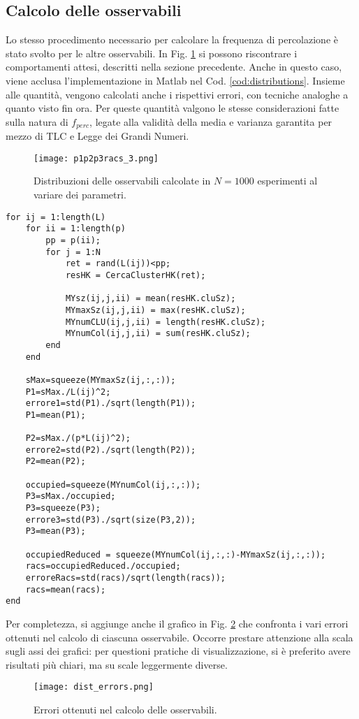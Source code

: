 \subsection*{Calcolo delle osservabili}
Lo stesso procedimento necessario per calcolare la frequenza di percolazione è stato svolto per 
le altre osservabili. In Fig. \ref{fig:distributions} si possono riscontrare i comportamenti 
attesi, descritti nella sezione precedente.
Anche in questo caso, viene acclusa l'implementazione in Matlab nel Cod. \ref{cod:distributions}.
Insieme alle quantità, vengono calcolati anche i rispettivi errori, con tecniche analoghe a quanto visto 
fin ora. Per queste quantità valgono le stesse considerazioni fatte sulla natura di $f_{perc}$,
legate alla validità della media e varianza garantita per mezzo di 
TLC e Legge dei Grandi Numeri.
\begin{figure}[ht]
    \texttt{[image: p1p2p3racs\_3.png]}
    \caption{Distribuzioni delle osservabili calcolate in $N=1000$ esperimenti al variare dei parametri.}
    \label{fig:distributions}
\end{figure}
\begin{lstlisting}[caption={Porzione di codice per il calcolo delle osservabili.},label={cod:distributions}]
for ij = 1:length(L)
    for ii = 1:length(p)
        pp = p(ii);
        for j = 1:N
            ret = rand(L(ij))<pp;
            resHK = CercaClusterHK(ret);

            MYsz(ij,j,ii) = mean(resHK.cluSz);
            MYmaxSz(ij,j,ii) = max(resHK.cluSz);
            MYnumCLU(ij,j,ii) = length(resHK.cluSz);
            MYnumCol(ij,j,ii) = sum(resHK.cluSz);
        end
    end
   
    sMax=squeeze(MYmaxSz(ij,:,:));
    P1=sMax./L(ij)^2;
    errore1=std(P1)./sqrt(length(P1));
    P1=mean(P1);

    P2=sMax./(p*L(ij)^2);
    errore2=std(P2)./sqrt(length(P2));
    P2=mean(P2);

    occupied=squeeze(MYnumCol(ij,:,:));
    P3=sMax./occupied;
    P3=squeeze(P3);
    errore3=std(P3)./sqrt(size(P3,2));
    P3=mean(P3);

    occupiedReduced = squeeze(MYnumCol(ij,:,:)-MYmaxSz(ij,:,:));
    racs=occupiedReduced./occupied;
    erroreRacs=std(racs)/sqrt(length(racs));
    racs=mean(racs);
end
\end{lstlisting}

Per completezza, si aggiunge anche il grafico in Fig. \ref{fig:dist_errors} che confronta i vari errori 
ottenuti nel calcolo di ciascuna osservabile. Occorre prestare attenzione alla scala
sugli assi dei grafici: per questioni pratiche di visualizzazione, si è preferito
avere risultati più chiari, ma su scale leggermente diverse.
\begin{figure}[ht]
    \texttt{[image: dist\_errors.png]}
    \caption{Errori ottenuti nel calcolo delle osservabili.}
    \label{fig:dist_errors}
\end{figure}

